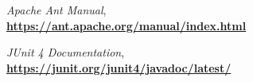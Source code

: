 \begin{thebibliography}{99}
    \emph{Apache Ant Manual}, \\
    \href{https://ant.apache.org/manual/index.html}{\textbf{https://ant.apache.org/manual/index.html}}

    \emph{JUnit 4 Documentation}, \\
    \href{https://junit.org/junit4/javadoc/latest/}{\textbf{https://junit.org/junit4/javadoc/latest/}}

     
     
     
     
     
     

     
    \end{thebibliography}